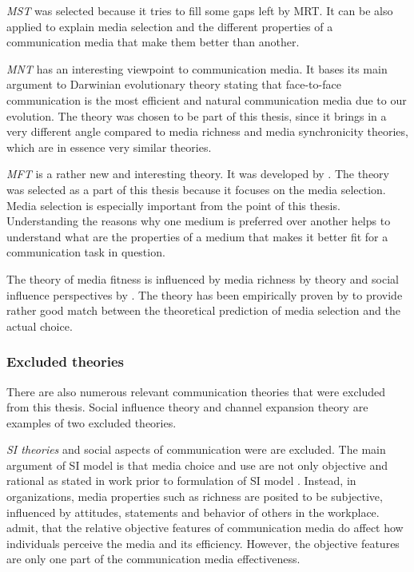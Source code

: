 \documentclass[english,12pt,a4paper,pdftex]{article}
\begin{document}
\emph{\Acl{MST}} was selected because it tries to fill some gaps left by \ac{MRT}. It can be also applied to explain media selection and the different properties of a communication media that make them better than another.

\emph{\Acl{MNT}} has an interesting viewpoint to communication media. It bases its main argument to Darwinian evolutionary theory stating that face-to-face communication is the most efficient and natural communication media due to our evolution. The theory was chosen to be part of this thesis, since it brings in a very different angle compared to media richness and media synchronicity theories, which are in essence very similar theories.

\emph{\Acl{MFT}} is a rather new and interesting theory. It was developed by \citet{higa2007}. The theory was selected as a part of this thesis because it focuses on the media selection. Media selection is especially important from the point of this thesis. Understanding the reasons why one medium is preferred over another helps to understand what are the properties of a medium that makes it better fit for a communication task in question.

The theory of media fitness is influenced by media richness by \citet{daft1986} theory and social influence perspectives by \citet{schmitz1991}. The theory has been empirically proven by \citet{gu2011} to provide rather good match between the theoretical prediction of media selection and the actual choice.

\subsubsection{Excluded theories}

There are also numerous relevant communication theories that were excluded from this thesis. Social influence theory and channel expansion theory are examples of two excluded theories.

\emph{\Ac{SI} theories} and social aspects of communication were are excluded. The main argument of \ac{SI} model is that media choice and use are not only objective and rational as stated in work prior to formulation of \ac{SI} model \citep{fulk1987}. Instead, in organizations, media properties such as richness are posited to be subjective, influenced by attitudes, statements and behavior of others in the workplace. \citet{schmitz1991} admit, that the relative objective features of communication media do affect how individuals perceive the media and its efficiency. However, the objective features are only one part of the communication media effectiveness.
\end{document}
